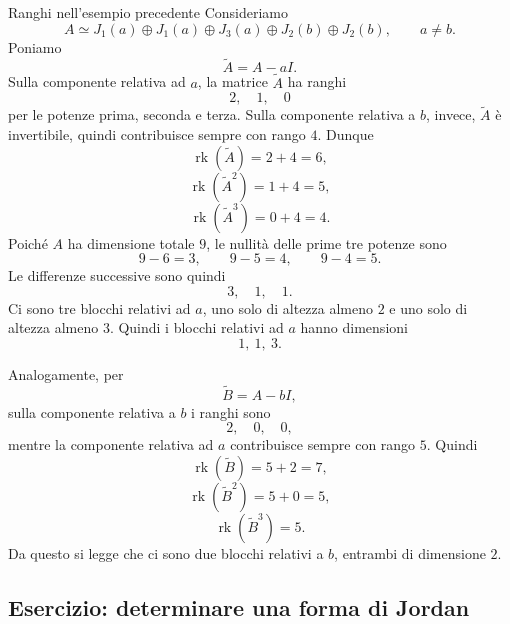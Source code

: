 \documentclass[a4paper]{article}
\begin{document}
\begin{radioactive}
\begin{snippetexample}{Ranghi nell'esempio precedente}
    Consideriamo
    \[
        A\simeq
        J_1(a)\oplus J_1(a)\oplus J_3(a)\oplus J_2(b)\oplus J_2(b),
        \qquad
        a\neq b.
    \]
    Poniamo
    \[
        \widetilde{A}=A-aI.
    \]
    Sulla componente relativa ad \(a\), la matrice \(\widetilde{A}\) ha ranghi
    \[
        2,\quad 1,\quad 0
    \]
    per le potenze prima, seconda e terza. Sulla componente relativa a \(b\), invece, \(\widetilde{A}\) è invertibile, quindi contribuisce sempre con rango \(4\). Dunque
    \[
        \operatorname{rk}(\widetilde{A})=2+4=6,
    \]
    \[
        \operatorname{rk}(\widetilde{A}^2)=1+4=5,
    \]
    \[
        \operatorname{rk}(\widetilde{A}^3)=0+4=4.
    \]
    Poiché \(A\) ha dimensione totale \(9\), le nullità delle prime tre potenze sono
    \[
        9-6=3,
        \qquad
        9-5=4,
        \qquad
        9-4=5.
    \]
    Le differenze successive sono quindi
    \[
        3,\quad 1,\quad 1.
    \]
    Ci sono tre blocchi relativi ad \(a\), uno solo di altezza almeno \(2\) e uno solo di altezza almeno \(3\). Quindi i blocchi relativi ad \(a\) hanno dimensioni
    \[
        1,\ 1,\ 3.
    \]

    Analogamente, per
    \[
        \widetilde{B}=A-bI,
    \]
    sulla componente relativa a \(b\) i ranghi sono
    \[
        2,\quad 0,\quad 0,
    \]
    mentre la componente relativa ad \(a\) contribuisce sempre con rango \(5\). Quindi
    \[
        \operatorname{rk}(\widetilde{B})=5+2=7,
    \]
    \[
        \operatorname{rk}(\widetilde{B}^2)=5+0=5,
    \]
    \[
        \operatorname{rk}(\widetilde{B}^3)=5.
    \]
    Da questo si legge che ci sono due blocchi relativi a \(b\), entrambi di dimensione \(2\).
\end{snippetexample}
\end{radioactive}

\subsection{Esercizio: determinare una forma di Jordan}
\end{document}
